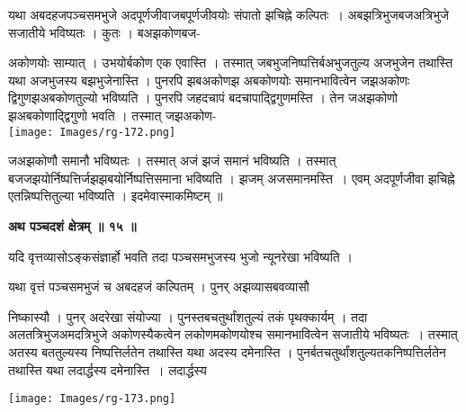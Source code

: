 \documentclass[11pt, openany]{book}
\begin{document}
यथा अबदहजपञ्चसमभुजे अदपूर्णजीवाजबपूर्णजीवयोः संपातो झचिह्ने कल्पितः~। अबझत्रिभुजबजअत्रिभुजे सजातीये भविष्यतः ।  कुतः । बअझकोणबज-
\vspace{-2mm}

\begin{vwcol}[widths={0.7,0.3}, sep=.8cm, rule=0pt]
अकोणयोः साम्यात् । उभयोर्बकोण एक एवास्ति । तस्मात् जबभुजनिष्पत्तिर्बअभुजतुल्य अजभुजेन तथास्ति यथा अजभुजस्य बझभुजेनास्ति । पुनरपि झबअकोणझ अबकोणयोः समानभावित्वेन जझअकोणः द्विगुणझअबकोणतुल्यो भविष्यति । पुनरपि जहदचापं बदचापाद्द्विगुणमस्ति । तेन जअझकोणो झअबकोणाद्द्विगुणो भवति । तस्मात् जझअकोण-\\
\noindent \texttt{[image: Images/rg-172.png]}  
\end{vwcol}
\vspace{-5mm}

\noindent 
जअझकोणौ समानौ भविष्यतः । तस्मात् अजं झजं समानं भविष्यति । तस्मात् बजजझयोर्निष्पत्तिर्जझझबयोर्निष्पत्तिसमाना भविष्यति । झजम् अजसमानमस्ति~। एवम् अदपूर्णजीवा झचिह्ने एतन्निष्पत्तितुल्या भविष्यति ।
इदमेवास्माकमिष्टम् ॥\\
\begin{center}
\textbf{\large अथ पञ्चदशं क्षेत्रम् ॥ १५ ॥ }
\end{center}
\vspace{5mm}

{\ab यदि वृत्तव्यासोऽङ्कसंज्ञार्हो भवति तदा पञ्चसमभुजस्य भुजो न्यूनरेखा भविष्यति । }

\newpage
यथा वृत्तं पञ्चसमभुजं च अबदहजं कल्पितम् । पुनर् अझव्यासबवव्यासौ 
\begin{vwcol}[widths={0.65,0.35}, sep=.8cm, rule=0pt]
निष्कास्यौ । पुनर् अदरेखा संयोज्या । पुनस्तबचतुर्थांशतुल्यं तकं पृथक्कार्यम् । तदा अलतत्रिभुजअमदत्रिभुजे अकोणस्यैकत्वेन लकोणमकोणयोश्च समानभावित्वेन सजातीये भविष्यतः~। तस्मात् अतस्य बततुल्यस्य निष्पत्तिर्लतेन  तथास्ति यथा अदस्य दमेनास्ति । पुनर्बतचतुर्थांशतुल्यतकनिष्पत्तिर्लतेन तथास्ति यथा लदार्द्धस्य दमेनास्ति~। लदार्द्धस्य\\
\vspace{5mm}

\noindent \texttt{[image: Images/rg-173.png]}  
\end{vwcol}
\vspace{-3mm}
\end{document}

